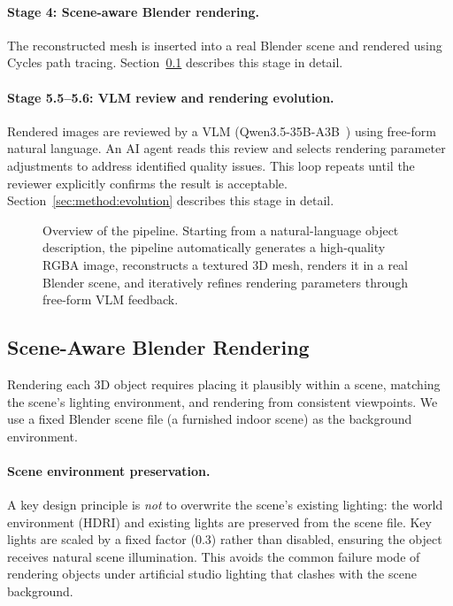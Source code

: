 \paragraph{Stage 4: Scene-aware Blender rendering.}
The reconstructed mesh is inserted into a real Blender scene and rendered using
Cycles path tracing.
Section~\ref{sec:method:blender} describes this stage in detail.

\paragraph{Stage 5.5--5.6: VLM review and rendering evolution.}
Rendered images are reviewed by a VLM (Qwen3.5-35B-A3B~\cite{PLACEHOLDER_qwen35_verify})
using free-form natural language.
An AI agent reads this review and selects rendering parameter adjustments
to address identified quality issues.
This loop repeats until the reviewer explicitly confirms the result is acceptable.
Section~\ref{sec:method:evolution} describes this stage in detail.

\begin{figure}[t]
  \centering
  \caption{
    Overview of the \aris{} pipeline.
    Starting from a natural-language object description,
    the pipeline automatically generates a high-quality RGBA image,
    reconstructs a textured 3D mesh, renders it in a real Blender scene,
    and iteratively refines rendering parameters through free-form VLM feedback.
  }
  \label{fig:pipeline}
\end{figure}


\subsection{Scene-Aware Blender Rendering}
\label{sec:method:blender}

Rendering each 3D object requires placing it plausibly within a scene,
matching the scene's lighting environment, and rendering from consistent viewpoints.
We use a fixed Blender scene file (a furnished indoor scene) as the background environment.

\paragraph{Scene environment preservation.}
A key design principle is \emph{not} to overwrite the scene's existing lighting:
the world environment (HDRI) and existing lights are preserved from the scene file.
Key lights are scaled by a fixed factor (0.3) rather than disabled,
ensuring the object receives natural scene illumination.
This avoids the common failure mode of rendering objects under artificial studio lighting
that clashes with the scene background.

